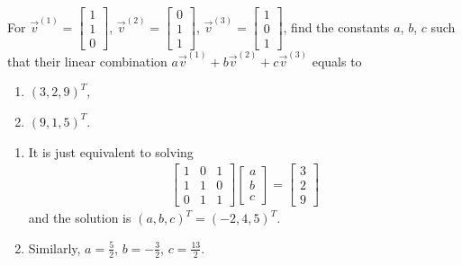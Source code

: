 \begin{Exercise}
For $\vec{v}^{(1)} =
\begin{bmatrix}
1\\
1\\
0
\end{bmatrix}$,
$\vec{v}^{(2)} =
\begin{bmatrix}
0\\
1\\
1
\end{bmatrix}$,
$\vec{v}^{(3)} =
\begin{bmatrix}
1\\
0\\
1
\end{bmatrix}$,
find the constants $a$, $b$, $c$ such that their linear combination $a\vec{v}^{(1)} + b\vec{v}^{(2)} + c\vec{v}^{(3)}$ equals to 
\begin{enumerate}[label=(\alph*)]
\item $(3,2,9)^T$, 
\item $(9,1,5)^T$.
\end{enumerate}
\end{Exercise}
\begin{Answer}
\begin{enumerate}[label=(\alph*)]
\item It is just equivalent to solving
\begin{align*}
\begin{bmatrix}
1 & 0 & 1 \\
1 & 1 & 0 \\
0 & 1 & 1
\end{bmatrix}
\begin{bmatrix}
a \\
b \\
c
\end{bmatrix}
=
\begin{bmatrix}
3 \\
2 \\
9
\end{bmatrix}
\end{align*}
and the solution is $(a,b,c)^T = (-2,4,5)^T$.
\item Similarly, $a = \frac{5}{2}$, $b = -\frac{3}{2}$, $c = \frac{13}{2}$. 
\end{enumerate}
\end{Answer}

